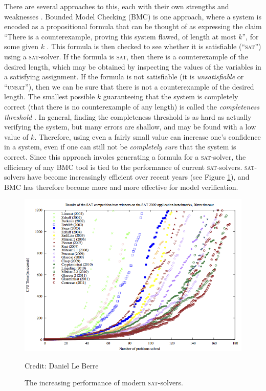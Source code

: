 \documentclass[proof,pdftex,11pt,a4,titlepage]{article}
\newcommand{\credit}[1]{\par\hfill \footnotesize Credit: #1}
\newcommand{\sat}{\textsc{sat}}
\newcommand{\unsat}{\textsc{unsat}}
\begin{document}
There are several approaches to this, each with their own strengths and weaknesses \cite{Dsilva:2008}. Bounded Model Checking (BMC) is one approach, where a system is encoded as a propositional formula that can be thought of as expressing the claim ``There is a counterexample, proving this system flawed, of length at most $k$'', for some given $k$ \cite{Biere:1999}. This formula is then checked to see whether it is satisfiable (``\sat'') using a \sat{}-solver. If the formula is \sat, then there is a counterexample of the desired length, which may be obtained by inspecting the values of the variables in a satisfying assignment. If the formula is not satisfiable (it is \emph{unsatisfiable} or ``\unsat''), then we can be sure that there is not a counterexample of the desired length. The smallest possible $k$ guaranteeing that the system is completely correct (that there is no counterexample of any length) is called the \emph{completeness threshold} \cite{Kroening:2003}. In general, finding the completeness threshold is as hard as actually verifying the system, but many errors are shallow, and may be found with a low value of $k$. Therefore, using even a fairly small value can increase one's confidence in a system, even if one can still not be \emph{completely sure} that the system is correct. Since this approach involes generating a formula for a \sat{}-solver, the efficiency of any BMC tool is tied to the performance of current \sat{}-solvers. \sat{}-solvers have become increasingly efficient over recent years (see Figure \ref{fig:sat-solver-perf}), and BMC has therefore become more and more effective for model verification.

\begin{figure}[h]
  \includegraphics[width=\textwidth]{sat-perf}
  \credit{Daniel Le Berre}
  \caption{The increasing performance of modern \sat{}-solvers.}
  \label{fig:sat-solver-perf}
\end{figure}
\end{document}
